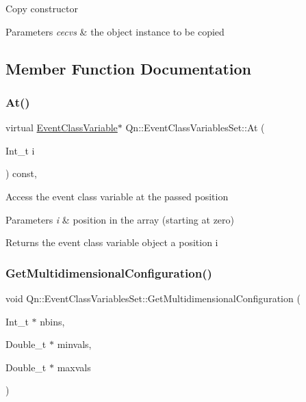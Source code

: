 Copy constructor 
\begin{DoxyParams}{Parameters}
{\em cecvs} & the object instance to be copied \\
\hline
\end{DoxyParams}


\subsection{Member Function Documentation}
\mbox{\label{classQn_1_1EventClassVariablesSet_a774502be50fb3609d911872e0d1f3f3a}} 
\subsubsection{\texorpdfstring{At()}{At()}}
{\footnotesize\ttfamily virtual \mbox{\hyperlink{classQn_1_1EventClassVariable}{Event\+Class\+Variable}}$\ast$ Qn\+::\+Event\+Class\+Variables\+Set\+::\+At (\begin{DoxyParamCaption}\item[{Int\+\_\+t}]{i }\end{DoxyParamCaption}) const\hspace{0.3cm}{\ttfamily [inline]}, {\ttfamily [virtual]}}

Access the event class variable at the passed position 
\begin{DoxyParams}{Parameters}
{\em i} & position in the array (starting at zero) \\
\hline
\end{DoxyParams}
\begin{DoxyReturn}{Returns}
the event class variable object a position i 
\end{DoxyReturn}
\mbox{\label{classQn_1_1EventClassVariablesSet_a24d5fb123ec23c08a07268a736312593}} 
\subsubsection{\texorpdfstring{Get\+Multidimensional\+Configuration()}{GetMultidimensionalConfiguration()}}
{\footnotesize\ttfamily void Qn\+::\+Event\+Class\+Variables\+Set\+::\+Get\+Multidimensional\+Configuration (\begin{DoxyParamCaption}\item[{Int\+\_\+t $\ast$}]{nbins,  }\item[{Double\+\_\+t $\ast$}]{minvals,  }\item[{Double\+\_\+t $\ast$}]{maxvals }\end{DoxyParamCaption})}

